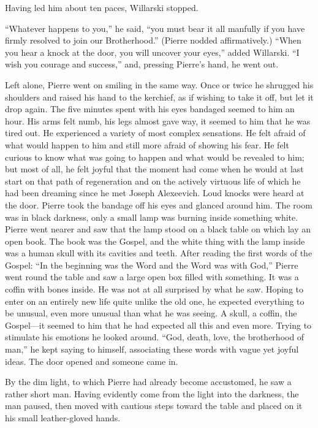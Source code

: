 Having led him about ten paces, Willarski stopped.

``Whatever happens to you,'' he said, ``you must bear it all
manfully if you have firmly resolved to join our Brotherhood.''
(Pierre nodded affirmatively.) ``When you hear a knock at the
door, you will uncover your eyes,'' added Willarski. ``I wish you
courage and success,'' and, pressing Pierre's hand, he went out.

Left alone, Pierre went on smiling in the same way. Once or twice
he shrugged his shoulders and raised his hand to the kerchief, as
if wishing to take it off, but let it drop again. The five
minutes spent with his eyes bandaged seemed to him an hour. His
arms felt numb, his legs almost gave way, it seemed to him that
he was tired out. He experienced a variety of most complex
sensations. He felt afraid of what would happen to him and still
more afraid of showing his fear. He felt curious to know what was
going to happen and what would be revealed to him; but most of
all, he felt joyful that the moment had come when he would at
last start on that path of regeneration and on the actively
virtuous life of which he had been dreaming since he met Joseph
Alexeevich. Loud knocks were heard at the door. Pierre took the
bandage off his eyes and glanced around him. The room was in
black darkness, only a small lamp was burning inside something
white. Pierre went nearer and saw that the lamp stood on a black
table on which lay an open book.  The book was the Gospel, and
the white thing with the lamp inside was a human skull with its
cavities and teeth. After reading the first words of the Gospel:
``In the beginning was the Word and the Word was with God,''
Pierre went round the table and saw a large open box filled with
something. It was a coffin with bones inside. He was not at all
surprised by what he saw. Hoping to enter on an entirely new life
quite unlike the old one, he expected everything to be unusual,
even more unusual than what he was seeing. A skull, a coffin, the
Gospel---it seemed to him that he had expected all this and even
more. Trying to stimulate his emotions he looked around. ``God,
death, love, the brotherhood of man,'' he kept saying to himself,
associating these words with vague yet joyful ideas. The door
opened and someone came in.

By the dim light, to which Pierre had already become accustomed,
he saw a rather short man. Having evidently come from the light
into the darkness, the man paused, then moved with cautious steps
toward the table and placed on it his small leather-gloved hands.


